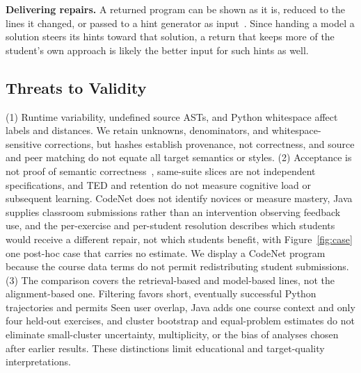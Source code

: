 \documentclass[10pt,conference]{IEEEtran}
\begin{document}
\noindent\textbf{Delivering repairs.} A returned program can be shown as it is, reduced to the lines it changed, or passed to a hint generator as input~\cite{phung2023generating,roest2024next}. Since handing a model a solution steers its hints toward that solution, a return that keeps more of the student's own approach is likely the better input for such hints as well.

\subsection{Threats to Validity}
(1) Runtime variability, undefined source ASTs, and Python whitespace affect labels and distances. We retain unknowns, denominators, and whitespace-sensitive corrections, but hashes establish provenance, not correctness, and source and peer matching do not equate all target semantics or styles. (2) Acceptance is not proof of semantic correctness~\cite{smith2015cure}, same-suite slices are not independent specifications, and TED and retention do not measure cognitive load or subsequent learning. CodeNet does not identify novices or measure mastery, Java supplies classroom submissions rather than an intervention observing feedback use, and the per-exercise and per-student resolution describes which students would receive a different repair, not which students benefit, with Figure~\ref{fig:case} one post-hoc case that carries no estimate. We display a CodeNet program because the course data terms do not permit redistributing student submissions. (3) The comparison covers the retrieval-based and model-based lines, not the alignment-based one. Filtering favors short, eventually successful Python trajectories and permits Seen user overlap, Java adds one course context and only four held-out exercises, and cluster bootstrap and equal-problem estimates do not eliminate small-cluster uncertainty, multiplicity, or the bias of analyses chosen after earlier results. These distinctions limit educational and target-quality interpretations.
\end{document}
